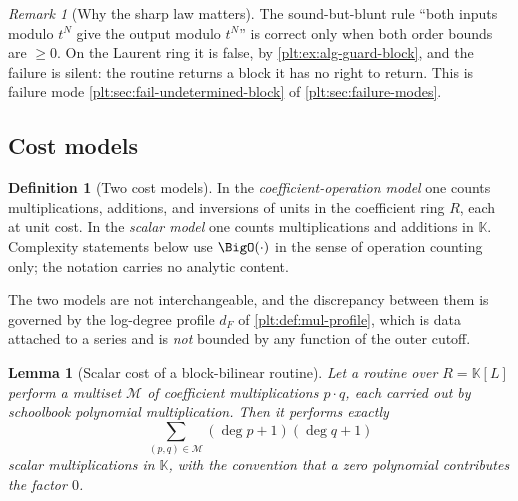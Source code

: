\documentclass[11pt,oneside]{article}
\theoremstyle{plain}
\newtheorem{lemma}[theorem]{Lemma}
\theoremstyle{definition}
\newtheorem{definition}[theorem]{Definition}
\theoremstyle{remark}
\newtheorem{remark}[theorem]{Remark}
\newcommand{\K}{\mathbb{K}}
\newcommand{\dprofile}[1]{d_{#1}}                        %
\begin{document}
\begin{remark}[Why the sharp law matters]
The sound-but-blunt rule ``both inputs modulo \(t^N\) give the output modulo
\(t^N\)'' is correct only when both order bounds are \(\ge0\).  On the Laurent
ring it is false, by \cref{plt:ex:alg-guard-block}, and the failure is silent:
the routine returns a block it has no right to return.  This is failure mode
\ref{plt:sec:fail-undetermined-block} of \cref{plt:sec:failure-modes}.
\end{remark}

\subsection{Cost models}
\label{plt:sec:alg-cost}

\begin{definition}[Two cost models]\label{plt:def:alg-cost-models}
In the \emph{coefficient-operation model} one counts multiplications,
additions, and inversions of units in the coefficient ring \(R\), each at unit
cost.  In the \emph{scalar model} one counts multiplications and additions in
\(\K\).  Complexity statements below use \(\BigO(\cdot)\) in the sense of
operation counting only; the notation carries no analytic content.
\end{definition}

The two models are not interchangeable, and the discrepancy between them is
governed by the log-degree profile \(\dprofile{F}\) of
\cref{plt:def:mul-profile}, which is data attached to a series and is
\emph{not} bounded by any function of the outer cutoff.

\begin{lemma}[Scalar cost of a block-bilinear routine]
\label{plt:lem:alg-scalar-cost}
Let a routine over \(R=\K[L]\) perform a multiset \(\mathcal M\) of coefficient
multiplications \(p\cdot q\), each carried out by schoolbook polynomial
multiplication.  Then it performs exactly
\[
 \sum_{(p,q)\in\mathcal M}(\deg p+1)(\deg q+1)
\]
scalar multiplications in \(\K\), with the convention that a zero polynomial
contributes the factor \(0\).
\end{lemma}
\end{document}
